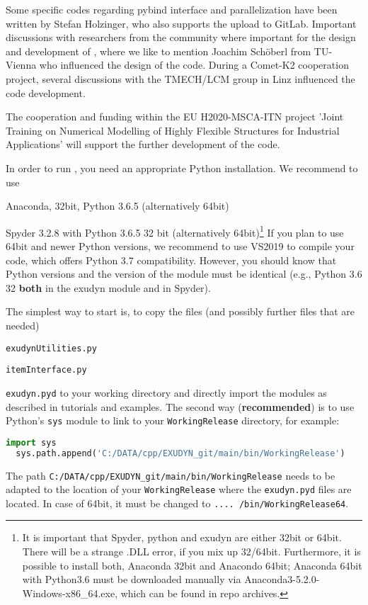Some specific codes regarding pybind interface and parallelization have been written by Stefan Holzinger, who also supports the upload to GitLab.
Important discussions with researchers from the community where important for the design and development of \codeName , where we like to mention Joachim Sch{\"o}berl from TU-Vienna who influenced the design of the code. During a Comet-K2 cooperation project, several discussions with the TMECH/LCM group in Linz influenced the code development.

The cooperation and funding within the EU H2020-MSCA-ITN project 'Joint Training on Numerical Modelling of Highly Flexible Structures for Industrial Applications' will support the further development of the code.
%

In order to run \codeName , you need an appropriate Python installation.
We recommend to use
\bi
  \item Anaconda, 32bit, Python 3.6.5 (alternatively 64bit)
	\item Spyder 3.2.8 with Python 3.6.5 32 bit (alternatively 64bit)\footnote{It is important that Spyder, python and exudyn are either 32bit or 64bit. There will be a strange .DLL error, if you mix up 32/64bit. Furthermore, it is possible to install both, Anaconda 32bit and Anacondo 64bit; Anaconda 64bit with Python3.6 must be downloaded manually via Anaconda3-5.2.0-Windows-x86\_64.exe, which can be found in repo archives.}
\ei
If you plan to use 64bit and newer Python versions, we recommend to use VS2019 to compile your code, which offers Python 3.7 compatibility.
However, you should know that Python versions and the version of the module must be identical (e.g., Python 3.6 32 {\bf both} in the exudyn module and in Spyder).

The simplest way to start is, to copy the files (and possibly further files that are needed)
\bi
  \item \texttt{exudynUtilities.py}
  \item \texttt{itemInterface.py}
  \item \texttt{exudyn.pyd}
\ei
to your working directory and directly import the modules as described in tutorials and examples.
The second way ({\bf recommended}) is to use Python's \texttt{sys} module to link to your \texttt{WorkingRelease} directory, for example:\vspace{6pt}\\
\pythonstyle
\begin{lstlisting}[language=Python, firstnumber=1]
  import sys
  sys.path.append('C:/DATA/cpp/EXUDYN_git/main/bin/WorkingRelease')
\end{lstlisting}
The path \texttt{C:/DATA/cpp/EXUDYN\_git/main/bin/WorkingRelease} needs to be adapted to the location of your \texttt{WorkingRelease} where the \texttt{exudyn.pyd} files are located. In case of 64bit, it must be changed to \texttt{.... /bin/WorkingRelease64}.

